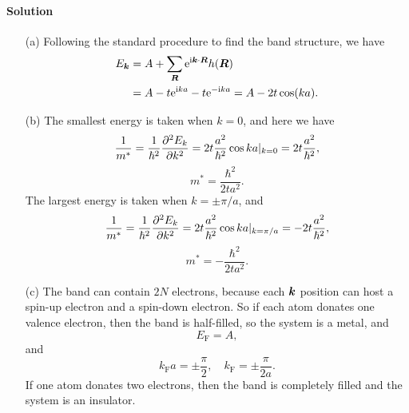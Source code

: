 \documentclass[hyperref, a4paper]{article}
\newcommand*{\ii}{\mathrm{i}}
\newcommand*{\ee}{\mathrm{e}}
\begin{document}
\paragraph{Solution} \begin{itemize}
\item[(a)] Following the standard procedure to find the band structure, we have 
\begin{equation}
    \begin{aligned}
        E_{\vb*{k}} &= A + \sum_{\vb*{R}} \ee^{\ii \vb*{k} \cdot \vb*{R}} h(\vb*{R}) \\
        &= A - t \ee^{\ii k a} - t \ee^{- \ii k a} = A - 2 t \cos(ka).
    \end{aligned}
\end{equation}
\item[(b)] The smallest energy is taken when $k = 0$,
and here we have 
\begin{equation}
    \frac{1}{m^*} = \frac{1}{\hbar^2} \pdv[2]{E_k}{k} = 2 t \frac{a^2}{\hbar^2} \cos ka |_{k = 0} = 2 t \frac{a^2}{\hbar^2},
\end{equation}
\begin{equation}
    m^* = \frac{\hbar^2}{2 t a^2}.
\end{equation}
The largest energy is taken when $k = \pm \pi / a$,
and 
\begin{equation}
    \frac{1}{m^*} = \frac{1}{\hbar^2} \pdv[2]{E_k}{k} = 2 t \frac{a^2}{\hbar^2} \cos ka |_{k = \pi / a} = - 2 t \frac{a^2}{\hbar^2},
\end{equation}
\begin{equation}
    m^* = - \frac{\hbar^2}{2 t a^2}.
\end{equation}

\item[(c)] The band can contain $2N$ electrons,
because each $\vb*{k}$ position can host a spin-up electron and a spin-down electron.
So if each atom donates one valence electron,
then the band is half-filled,
so the system is a metal, and
\begin{equation}
    E_\text{F} = A,
\end{equation}
and 
\begin{equation}
    k_{\text{F}} a = \pm \frac{\pi}{2}, \quad k_{\text{F}} = \pm \frac{\pi}{2a}.
\end{equation}
If one atom donates two electrons,
then the band is completely filled and the system is an insulator.

\end{itemize}
\end{document}
